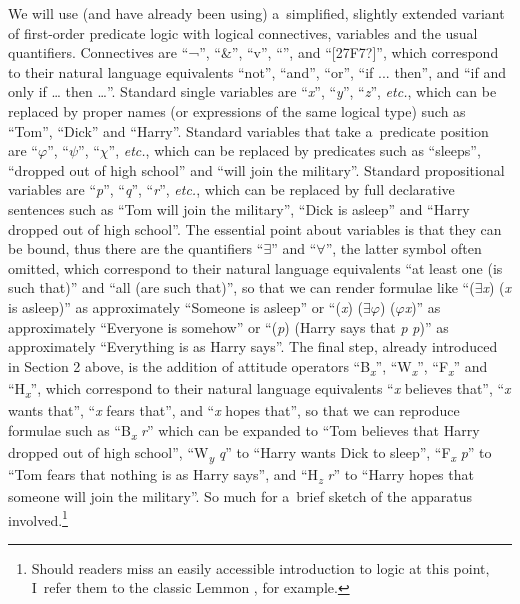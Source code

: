 We will use (and have already been using) a~simplified, slightly extended variant of first-order predicate logic with logical connectives, variables and the usual quantifiers. Connectives are ``¬'', ``\&'', ``v'', ``'', and ``[27F7?]'', which correspond to their natural language equivalents ``not'', ``and'', ``or'', ``if ... then'', and ``if and only if … then …''. Standard single variables are ``\textit{x}'', ``\textit{y}'', ``\textit{z}'', \textit{etc.}, which can be replaced by proper names (or expressions of the same logical type) such as ``Tom'', ``Dick'' and ``Harry''. Standard variables that take a~predicate position are ``\textit{$\varphi $}'', ``\textit{$\psi $}'', ``\textit{$\chi $}'', \textit{etc.}, which can be replaced by predicates such as ``sleeps'', ``dropped out of high school'' and ``will join the military''. Standard propositional variables are ``\textit{p}'', ``\textit{q}'', ``\textit{r}'', \textit{etc.}, which can be replaced by full declarative sentences such as ``Tom will join the military'', ``Dick is asleep'' and ``Harry dropped out of high school''. The essential point about variables is that they can be bound, thus there are the quantifiers ``${\exists}$'' and ``${\forall}$'', the latter symbol often omitted, which correspond to their natural language equivalents ``at least one (is such that)'' and ``all (are such that)'', so that we can render formulae like ``(${\exists}$\textit{x}) (\textit{x} is asleep)'' as approximately ``Someone is asleep'' or ``(\textit{x}) (${\exists}$\textit{$\varphi $}) (\textit{$\varphi $x})'' as approximately ``Everyone is somehow'' or ``(\textit{p}) (Harry says that \textit{p}  \textit{p})'' as approximately ``Everything is as Harry says''. The final step, already introduced in Section 2 above, is the addition of attitude operators ``B\textit{\textsubscript{x}}'', ``W\textit{\textsubscript{x}}'', ``F\textit{\textsubscript{x}}'' and ``H\textit{\textsubscript{x}}'', which correspond to their natural language equivalents ``\textit{x} believes that'', ``\textit{x} wants that'', ``\textit{x} fears that'', and ``\textit{x} hopes that'', so that we can reproduce formulae such as ``B\textit{\textsubscript{x}} \textit{r}'' which can be expanded to ``Tom believes that Harry dropped out of high school'', ``W\textit{\textsubscript{y}} \textit{q}'' to ``Harry wants Dick to sleep'', ``F\textit{\textsubscript{x}} \textit{p}'' to ``Tom fears that nothing is as Harry says'', and ``H\textit{\textsubscript{z}} \textit{r}'' to ``Harry hopes that someone will join the military''. So much for a~brief sketch of the apparatus involved.\footnote{Should readers miss an easily accessible introduction to logic at this point, I~refer them to the classic Lemmon 
\parencite*[][]{lemmon_begining_1965}, %
 for example.}



